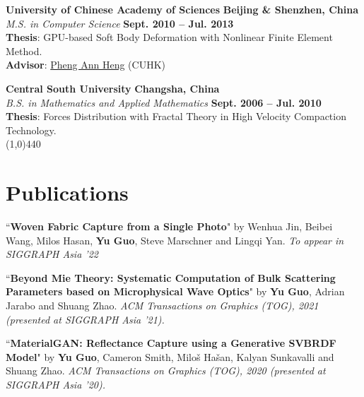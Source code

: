 \documentclass[margin,line]{resume}
\begin{document}
\begin{resume}
    \textbf{University of Chinese Academy of Sciences}  \hfill \textbf{Beijing \& Shenzhen, China}\\
    \textsl{M.S. in Computer Science}                 \hfill \textbf{Sept. 2010 -- Jul. 2013} \\
	\textbf{Thesis}: GPU-based Soft Body Deformation with Nonlinear Finite Element Method. \\
	\textbf{Advisor}: \href{http://www.cse.cuhk.edu.hk/~pheng/}{Pheng Ann Heng} (CUHK)

    \textbf{Central South University}      \hfill \textbf{Changsha, China} \\
    \textsl{B.S. in Mathematics and Applied Mathematics}                \hfill \textbf{Sept. 2006 -- Jul. 2010}  \\
	\textbf{Thesis}: Forces Distribution with Fractal Theory in High Velocity Compaction Technology. \\
    
    \vspace{-5.0mm}
    \line(1,0){440}
    \vspace{-5.0mm}

    \section{\mysidestyle Publications}
    
    ``\textbf{Woven Fabric Capture from a Single Photo}" 
    by Wenhua Jin, Beibei Wang, Milos Hasan, \textbf{Yu Guo}, Steve Marschner and Lingqi Yan. 
    \textsl{To appear in SIGGRAPH Asia '22}\\
    
    \vspace{-5mm}

    ``\textbf{Beyond Mie Theory: Systematic Computation of Bulk Scattering Parameters based on Microphysical Wave Optics}" 
    by \textbf{Yu Guo}, Adrian Jarabo and Shuang Zhao. 
    \textsl{ACM Transactions on Graphics (TOG), 2021 (presented at SIGGRAPH Asia '21).}\\
    
    \vspace{-5mm}

    ``\textbf{MaterialGAN: Reflectance Capture using a Generative SVBRDF Model}" 
    by \textbf{Yu Guo}, Cameron Smith, Milo\v{s} Ha\v{s}an, Kalyan Sunkavalli and Shuang Zhao. 
    \textsl{ACM Transactions on Graphics (TOG), 2020 (presented at SIGGRAPH Asia '20).}\\
    

\end{resume}
\end{document}
